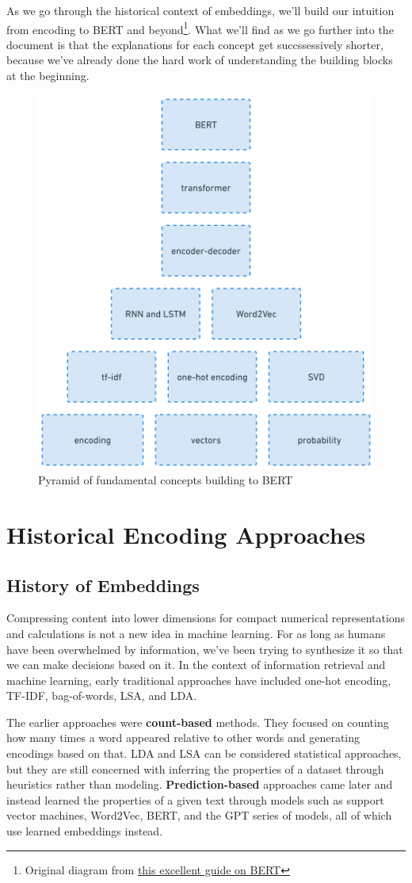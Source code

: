 \documentclass[11pt, table]{diazessay} %
\begin{document}
\begin{sloppypar}
As we go through the historical context of embeddings, we'll build our intuition from encoding to BERT and beyond\footnote{Original diagram from  \href{http://mccormickml.com/2019/11/11/bert-research-ep-1-key-concepts-and-sources/}{this excellent guide on BERT}}. What we'll find as we go further into the document is that the explanations for each concept get succssessively shorter, because we've already done the hard work of understanding the building blocks at the beginning. 

\begin{figure}[H]
\centering
\includegraphics[width=.6\textwidth]{figures/pyramid.png}
\caption{Pyramid of fundamental concepts building to BERT}
\end{figure}

\section{Historical Encoding Approaches}
\subsection{History of Embeddings}

Compressing content into lower dimensions for compact numerical representations and calculations is not a new idea in machine learning. For as long as humans have been overwhelmed by information, we've been trying to synthesize it so that we can make decisions based on it. In the context of information retrieval and machine learning, early traditional approaches have included one-hot encoding, TF-IDF, bag-of-words, LSA, and LDA. 

The earlier approaches were \textbf{count-based} methods. They focused on counting how many times a word appeared relative to other words and generating encodings based on that. LDA and LSA can be considered statistical approaches, but they are still concerned with inferring the properties of a dataset through heuristics rather than modeling. \textbf{Prediction-based} approaches came later and instead learned the properties of a given text through models  such as support vector machines, Word2Vec, BERT, and the GPT series of models, all of which use learned embeddings instead. 


\end{sloppypar}
\end{document}
